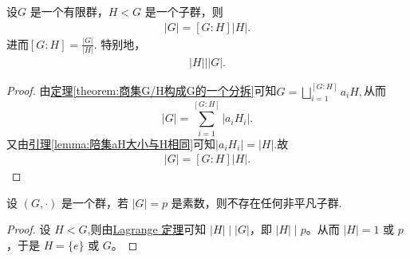 \documentclass[../../main.tex]{subfiles}
\begin{document}
\begin{theorem}[Lagrange定理]\label{theorem:Lagrange定理}
设\(G\) 是一个有限群，\(H < G\) 是一个子群，则
\begin{align*}
|G| = [G : H]|H|.
\end{align*}
进而$[G : H]=\frac{|G|}{|H|}$.
特别地，
\begin{align*}
|H| \Big| |G|.
\end{align*} 
\end{theorem}
\begin{proof}
由\hyperref[theorem:商集G/H构成G的一个分拆]{定理\ref{theorem:商集G/H构成G的一个分拆}}可知$G=\bigsqcup_{i=1}^{\left[ G:H \right]}{a_iH},$从而
\[
\left| G \right|=\sum_{i=1}^{\left[ G:H \right]}{\left|a_iH_i\right|}.
\]
又由\hyperref[lemma:陪集aH大小与H相同]{引理\ref{lemma:陪集aH大小与H相同}}可知$\left|a_iH_i\right|=\left|H\right|$.故\begin{align*}
|G| = [G : H]|H|.
\end{align*}
\end{proof}

\begin{example}
设 $(G,\cdot)$ 是一个群，若 $|G| = p$ 是素数，则不存在任何非平凡子群.
\end{example}
\begin{proof}
设 $H < G$,则由\hyperref[theorem:Lagrange定理]{Lagrange 定理}可知 $|H|\mid |G|$，即 $|H|\mid p$。从而 $|H| = 1$ 或 $p$，于是 $H = \{e\}$ 或 $G$。 
\end{proof}
\end{document}
